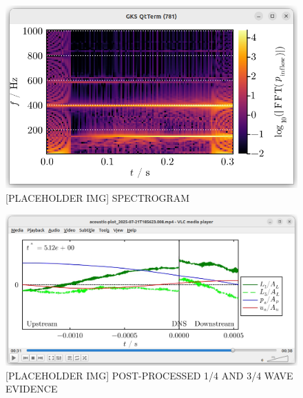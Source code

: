 \begin{figure}[t]
\centering
\includegraphics[scale=0.35]{assets/graphs/spectrogram.png}
\caption{[PLACEHOLDER IMG] SPECTROGRAM}
\label{fig:spectrogram}
\end{figure}

\begin{figure}[t]
\centering
\includegraphics[scale=0.35]{assets/graphs/pp-tones.png}
\caption{[PLACEHOLDER IMG] POST-PROCESSED 1/4 AND 3/4 WAVE EVIDENCE}
\label{fig:pp-tones}
\end{figure}


